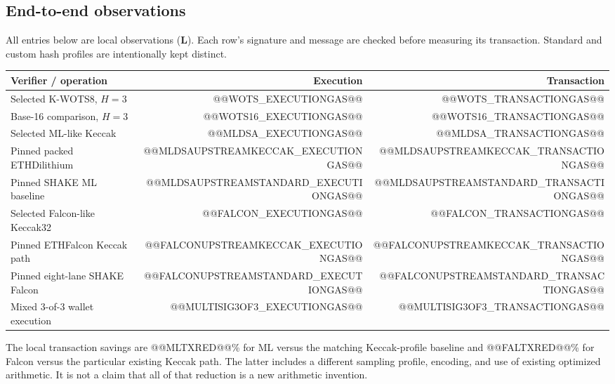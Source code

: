 \documentclass[11pt,a4paper]{article}
\newcommand{\local}{\textbf{L}}
\begin{document}
\subsection{End-to-end observations}
All entries below are local observations (\local). Each row's signature and
message are checked before measuring its transaction. Standard and custom
hash profiles are intentionally kept distinct.

\begin{tabularx}{\linewidth}{Yrr}
\toprule
\textbf{Verifier / operation} & \textbf{Execution} & \textbf{Transaction}\\
\midrule
Selected K-WOTS8, $H=3$ & @@WOTS_EXECUTIONGAS@@ & @@WOTS_TRANSACTIONGAS@@\\
Base-16 comparison, $H=3$ & @@WOTS16_EXECUTIONGAS@@ & @@WOTS16_TRANSACTIONGAS@@\\
Selected ML-like Keccak & @@MLDSA_EXECUTIONGAS@@ & @@MLDSA_TRANSACTIONGAS@@\\
Pinned packed ETHDilithium & @@MLDSAUPSTREAMKECCAK_EXECUTIONGAS@@ & @@MLDSAUPSTREAMKECCAK_TRANSACTIONGAS@@\\
Pinned SHAKE ML baseline & @@MLDSAUPSTREAMSTANDARD_EXECUTIONGAS@@ & @@MLDSAUPSTREAMSTANDARD_TRANSACTIONGAS@@\\
Selected Falcon-like Keccak32 & @@FALCON_EXECUTIONGAS@@ & @@FALCON_TRANSACTIONGAS@@\\
Pinned ETHFalcon Keccak path & @@FALCONUPSTREAMKECCAK_EXECUTIONGAS@@ & @@FALCONUPSTREAMKECCAK_TRANSACTIONGAS@@\\
Pinned eight-lane SHAKE Falcon & @@FALCONUPSTREAMSTANDARD_EXECUTIONGAS@@ & @@FALCONUPSTREAMSTANDARD_TRANSACTIONGAS@@\\
Mixed 3-of-3 wallet execution & @@MULTISIG3OF3_EXECUTIONGAS@@ & @@MULTISIG3OF3_TRANSACTIONGAS@@\\
\bottomrule
\end{tabularx}

The local transaction savings are @@MLTXRED@@\% for ML versus the matching
Keccak-profile baseline and @@FALTXRED@@\% for Falcon versus the particular
existing Keccak path. The latter includes a different sampling profile,
encoding, and use of existing optimized arithmetic. It is not a claim that
all of that reduction is a new arithmetic invention.
\end{document}
